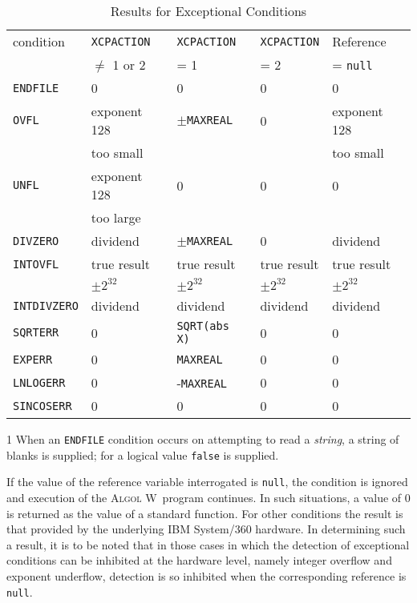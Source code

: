 \documentclass[a4paper]{article}
\def\ALGOLW{\textsc{Algol W}}
\def\A{\lstinline[language=AlgolW,style=ReferenceManual]}
\def\R#1{\lstinline[language=AlgolW,style=ReferenceManual]{#1}}
\def\T#1{\textit{#1}}
\begin{document}
\begin{table}
\begin{threeparttable}[b]
\caption{Results for Exceptional Conditions}
\begin{tabular}{l|llll}
condition      & \A!XCPACTION!  & \A!XCPACTION!    & \A!XCPACTION! &  Reference \\
               & $\not=$ 1 or 2 & = 1              & = 2           &  = \R{null} \\
\hline
\A!ENDFILE!\tnote{1}   & 0              & 0                & 0             & 0 \\
\A!OVFL!       & exponent 128   & $\pm$\A!MAXREAL! & 0             & exponent 128\\
               & too small      &                  &               & too small \\
\A!UNFL!       & exponent 128   & 0                & 0             & 0 \\
               & too large      &                  &               &   \\
\A!DIVZERO!    & dividend       & $\pm$\A!MAXREAL! & 0             & dividend \\
\A!INTOVFL!    & true result    & true result      & true result   & true result \\
               & $\pm 2^{32}$   &  $\pm 2^{32}$    &  $\pm 2^{32}$ &  $\pm 2^{32}$ \\
\A!INTDIVZERO! & dividend       & dividend         & dividend      & dividend \\
\A!SQRTERR!    & 0              & \A!SQRT(abs X)!  & 0             & 0 \\
\A!EXPERR!     & 0              & \A!MAXREAL!      & 0             & 0 \\
\A!LNLOGERR!   & 0              & -\A!MAXREAL!     & 0             & 0 \\
\A!SINCOSERR!  & 0              & 0                & 0             & 0
\end{tabular}
\begin{tablenotes}
\item[1] {\small When an \A!ENDFILE! condition occurs on attempting to read a \T{string}, a string of blanks is supplied; for a logical value \A!false! is supplied.}
\end{tablenotes}
\end{threeparttable}
\end{table}

If the value of the reference variable interrogated is \R{null}, the
condition is ignored and execution of the \ALGOLW\ program continues.
In such situations, a value of 0 is returned as the value of a
standard function.  For other conditions the result is that provided
by the underlying IBM System/360 hardware. In determining such a
result, it is to be noted that in those cases in which the detection
of exceptional conditions can be inhibited at the hardware level,
namely integer overflow and exponent underflow, detection is so
inhibited when the corresponding reference is \R{null}.
\end{document}
